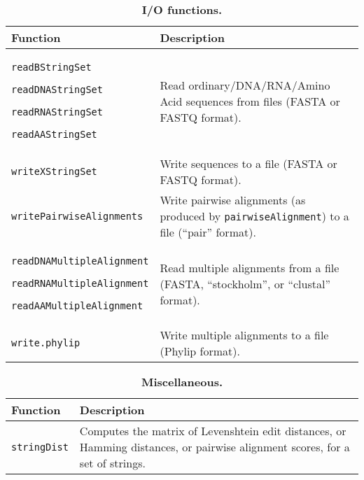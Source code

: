 \documentclass[10pt]{article}
\newcommand{\Rfunction}[1]{\texttt{#1}}
\begin{document}

\begin{table}[ht]
\begin{center}
\begin{tabular}{p{2.5in}|p{4in}}
{\bf Function} & {\bf Description} \\
\hline
\Rfunction{readBStringSet}\par
\Rfunction{readDNAStringSet}\par
\Rfunction{readRNAStringSet}\par
\Rfunction{readAAStringSet} &
    Read ordinary/DNA/RNA/Amino Acid sequences from files (FASTA or FASTQ
    format). \\
\hline
\Rfunction{writeXStringSet} &
    Write sequences to a file (FASTA or FASTQ format). \\
\hline
\Rfunction{writePairwiseAlignments} &
    Write pairwise alignments (as produced by \Rfunction{pairwiseAlignment})
    to a file (``pair'' format). \\
\hline
\Rfunction{readDNAMultipleAlignment}\par
\Rfunction{readRNAMultipleAlignment}\par
\Rfunction{readAAMultipleAlignment}&
    Read multiple alignments from a file (FASTA, ``stockholm'',
    or ``clustal'' format). \\
\hline
\Rfunction{write.phylip} &
    Write multiple alignments to a file (Phylip format). \\
\hline
\end{tabular}
\end{center}
\caption{\bf I/O functions.}
\label{table:I_O_functions}
\end{table}



\begin{table}[ht]
\begin{center}
\begin{tabular}{p{2.5in}|p{4in}}
{\bf Function} & {\bf Description} \\
\hline
\Rfunction{stringDist} &
    Computes the matrix of Levenshtein edit distances, or Hamming distances,
    or pairwise alignment scores, for a set of strings. \\
\hline
\end{tabular}
\end{center}
\caption{\bf Miscellaneous.}
\label{table:Miscellaneous}
\end{table}
\end{document}

